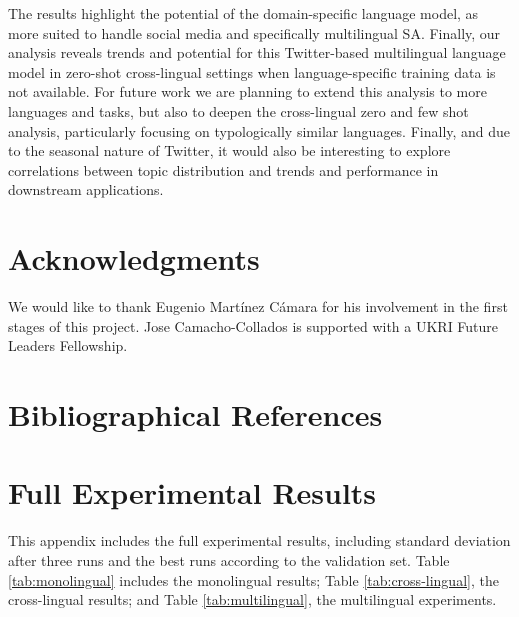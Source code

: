 \documentclass[10pt, a4paper]{article}
\begin{document}
The results highlight the potential of the domain-specific language model, as more suited to handle social media and specifically multilingual SA. Finally, our analysis reveals trends and potential for this Twitter-based multilingual language model in zero-shot cross-lingual settings when language-specific training data is not available. For future work we are planning to extend this analysis to more languages and tasks, but also to deepen the cross-lingual zero and few shot analysis, particularly focusing on typologically similar languages. Finally, and due to the seasonal nature of Twitter, it would also be interesting to explore correlations between topic distribution and trends and performance in downstream applications.

\section*{Acknowledgments}

We would like to thank Eugenio Martínez Cámara for his involvement in the first stages of this project. Jose Camacho-Collados is supported with a UKRI Future Leaders Fellowship.

\section{Bibliographical References}\label{reference}







\newpage














\appendix


\section{Full Experimental Results}

This appendix includes the full experimental results, including standard deviation after three runs and the best runs according to the validation set. Table \ref{tab:monolingual} includes the monolingual results; Table \ref{tab:cross-lingual}, the cross-lingual results; and Table \ref{tab:multilingual}, the multilingual experiments.
\end{document}
